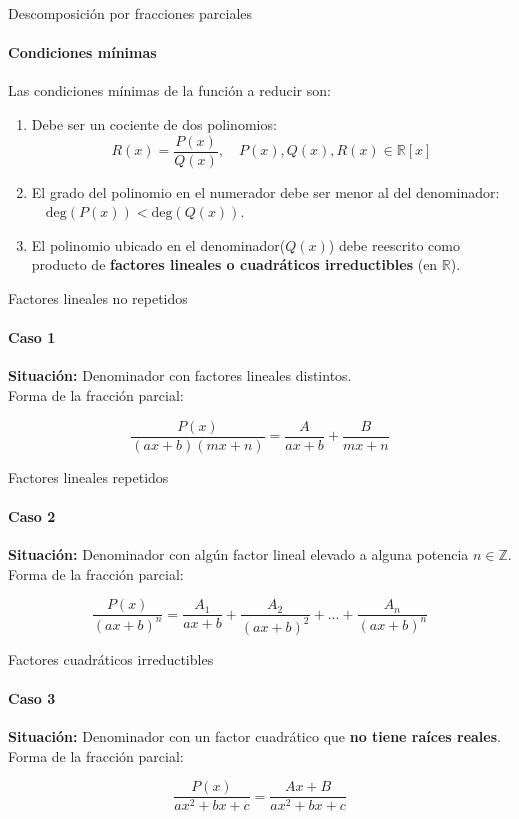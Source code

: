 \documentclass{plantillaPPT}
\begin{document}
\begin{frame}{Descomposición por fracciones parciales}
\framesubtitle{Condiciones mínimas}

Las condiciones mínimas de la función a reducir son:
\pause

\begin{enumerate}
    \item Debe ser un cociente de dos polinomios:
    \[R(x)=\frac{P(x)}{Q(x)}, \quad P(x),Q(x),R(x)\in\mathbb{R}[x] \]
    \pause
    \item El grado del polinomio en el numerador debe ser menor al del denominador: \(\displaystyle \quad \text{deg}(P(x))<\text{deg}(Q(x))\).
    \vspace{5pt}
    \pause
    \item El polinomio ubicado en el denominador(\(Q(x)\)) debe reescrito como producto de \textbf{factores lineales o cuadráticos irreductibles} (en \(\mathbb{R}\)).
\end{enumerate}

\end{frame}

\begin{frame}{Factores lineales no repetidos}
\framesubtitle{Caso 1}

\textbf{Situación: }Denominador con factores lineales distintos.\\[10pt]
Forma de la fracción parcial:

\[
\frac{P(x)}{(ax+b)(mx+n)} = \frac{A}{ax+b}+\frac{B}{mx+n}
\]
    
\end{frame}

\begin{frame}{Factores lineales repetidos}
\framesubtitle{Caso 2}

\textbf{Situación: }Denominador con algún factor lineal elevado a alguna potencia \(n\in\mathbb{Z}\).\\[10pt]
Forma de la fracción parcial:

\[
\frac{P(x)}{(ax+b)^n} = \frac{A_1}{ax+b}+\frac{A_2}{(ax+b)^2}+...+\frac{A_n}{(ax+b)^n}
\]
    
\end{frame}

\begin{frame}{Factores cuadráticos irreductibles}
\framesubtitle{Caso 3}

\textbf{Situación: }Denominador con un factor cuadrático que \textbf{no tiene raíces reales}.\\[10pt]
Forma de la fracción parcial:

\[
\frac{P(x)}{ax^2+bx+c} = \frac{Ax+B}{ax^2+bx+c}
\]
    
\end{frame}
\end{document}
